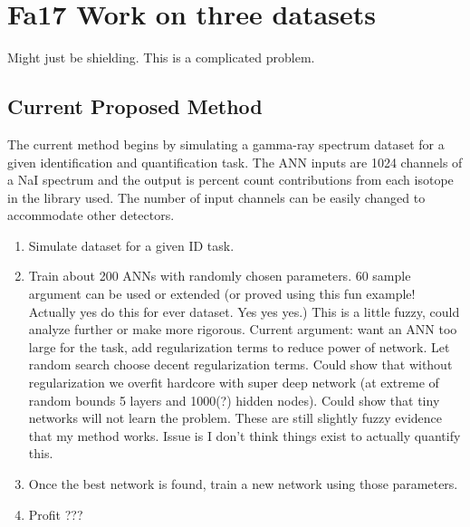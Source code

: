 \documentclass[thesis,tocnosub,noragright,centerchapter,12pt,fullpage]{uiucecethesis09}
\begin{document}
\section{Fa17 Work on three datasets}

Might just be shielding. This is a complicated problem. 

\subsection{Current Proposed Method}


The current method begins by simulating a gamma-ray spectrum dataset for a given identification and quantification task. The ANN inputs are 1024 channels of a NaI spectrum and the output is percent count contributions from each isotope in the library used. The number of input channels can be easily changed to accommodate other detectors. 

\begin{enumerate}
    \item Simulate dataset for a given ID task. 
  
    \item Train about 200 ANNs with randomly chosen parameters. 60 sample argument can be used or extended (or proved using this fun example! Actually yes do this for ever dataset. Yes yes yes.)
    \subitem This is a little fuzzy, could analyze further or make more rigorous.
    \subitem Current argument: want an ANN too large for the task, add regularization terms to reduce power of network. Let random search choose decent regularization terms. 
    \subsubitem Could show that without regularization we overfit hardcore with super deep network (at extreme of random bounds 5 layers and 1000(?) hidden nodes). 
    \subsubitem Could show that tiny networks will not learn the problem.
    \subsubitem These are still slightly fuzzy evidence that my method works. Issue is I don't think things exist to actually quantify this.

    \item Once the best network is found, train a new network using those parameters.
    
    \item Profit ???









\end{enumerate}
\end{document}
